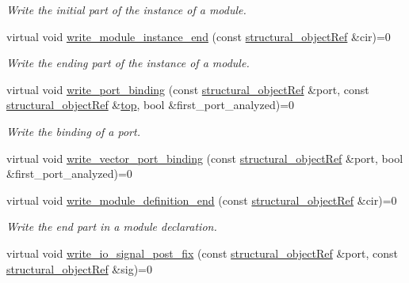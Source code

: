 \begin{DoxyCompactItemize}
\begin{DoxyCompactList}\small\item\em Write the initial part of the instance of a module. \end{DoxyCompactList}\item 
virtual void \hyperlink{classlanguage__writer_a58bc0c17545d1fc96385a5fbffbe62b2}{write\+\_\+module\+\_\+instance\+\_\+end} (const \hyperlink{structural__objects_8hpp_a8ea5f8cc50ab8f4c31e2751074ff60b2}{structural\+\_\+object\+Ref} \&cir)=0
\begin{DoxyCompactList}\small\item\em Write the ending part of the instance of a module. \end{DoxyCompactList}\item 
virtual void \hyperlink{classlanguage__writer_aae06225ee079da7199d6f7e9f35fa108}{write\+\_\+port\+\_\+binding} (const \hyperlink{structural__objects_8hpp_a8ea5f8cc50ab8f4c31e2751074ff60b2}{structural\+\_\+object\+Ref} \&port, const \hyperlink{structural__objects_8hpp_a8ea5f8cc50ab8f4c31e2751074ff60b2}{structural\+\_\+object\+Ref} \&\hyperlink{tutorial__pact__2019_2Introduction_2second_2module_8c_a363ff33001bb9810eee7a6a61179583b}{top}, bool \&first\+\_\+port\+\_\+analyzed)=0
\begin{DoxyCompactList}\small\item\em Write the binding of a port. \end{DoxyCompactList}\item 
virtual void \hyperlink{classlanguage__writer_a97f0527b8b3b510dc254108379edf440}{write\+\_\+vector\+\_\+port\+\_\+binding} (const \hyperlink{structural__objects_8hpp_a8ea5f8cc50ab8f4c31e2751074ff60b2}{structural\+\_\+object\+Ref} \&port, bool \&first\+\_\+port\+\_\+analyzed)=0
\item 
virtual void \hyperlink{classlanguage__writer_a57586ab4a2816a9eeb3658b9f072d02d}{write\+\_\+module\+\_\+definition\+\_\+end} (const \hyperlink{structural__objects_8hpp_a8ea5f8cc50ab8f4c31e2751074ff60b2}{structural\+\_\+object\+Ref} \&cir)=0
\begin{DoxyCompactList}\small\item\em Write the end part in a module declaration. \end{DoxyCompactList}\item 
virtual void \hyperlink{classlanguage__writer_a1789bbe12e4b1e4f168f4cc25bb7faff}{write\+\_\+io\+\_\+signal\+\_\+post\+\_\+fix} (const \hyperlink{structural__objects_8hpp_a8ea5f8cc50ab8f4c31e2751074ff60b2}{structural\+\_\+object\+Ref} \&port, const \hyperlink{structural__objects_8hpp_a8ea5f8cc50ab8f4c31e2751074ff60b2}{structural\+\_\+object\+Ref} \&sig)=0

\end{DoxyCompactItemize}
